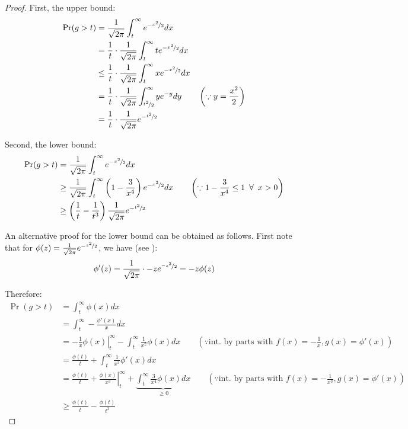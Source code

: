 \documentclass{article}
\theoremstyle{remark}
\begin{document}
\begin{proof}
First, the upper bound:
\begin{align*}
\Pr(g > t) &= \frac{1}{\sqrt{2\pi}}\int_{t}^{\infty} e^{-\nicefrac{x^{2}}{2}} dx \\
&= \frac{1}{t} \cdot \frac{1}{\sqrt{2\pi}}\int_{t}^{\infty} te^{-\nicefrac{x^{2}}{2}} dx \\
&\leq \frac{1}{t} \cdot \frac{1}{\sqrt{2\pi}}\int_{t}^{\infty} xe^{-\nicefrac{x^{2}}{2}} dx \\
&= \frac{1}{t} \cdot \frac{1}{\sqrt{2\pi}}\int_{\nicefrac{t^{2}}{2}}^{\infty} ye^{-y} dy \qquad \left(\because y = \frac{x^{2}}{2}\right)\\
&= \frac{1}{t} \cdot \frac{1}{\sqrt{2\pi}}e^{-\nicefrac{t^{2}}{2}}
\end{align*}

Second, the lower bound:
\begin{align*}
\Pr(g > t) &= \frac{1}{\sqrt{2\pi}}\int_{t}^{\infty} e^{-\nicefrac{x^{2}}{2}} dx \\
&\geq \frac{1}{\sqrt{2\pi}}\int_{t}^{\infty} \left(1 - \frac{3}{x^{4}}\right)e^{-\nicefrac{x^{2}}{2}} dx \qquad \left(\because 1 - \frac{3}{x^{4}} \leq 1 \enskip \forall \enskip x > 0\right) \\
&\geq \left(\frac{1}{t} - \frac{1}{t^{3}}\right)\frac{1}{\sqrt{2\pi}}e^{-\nicefrac{t^{2}}{2}}
\end{align*}

An alternative proof for the lower bound can be obtained as follows. First note that for \(\phi(z) = \frac{1}{\sqrt{2\pi}}e^{-\nicefrac{z^{2}}{2}}\), we have (see \citep{wainwright2019high}):
\begin{equation*}
\phi'(z) = \frac{1}{\sqrt{2\pi}} \cdot -ze^{\nicefrac{-z^{2}}{2}} = -z\phi(z)
\end{equation*}

Therefore:
\begin{align*}
\Pr(g > t) &= \int_{t}^{\infty} \phi(x) dx \\
&= \int_{t}^{\infty} -\frac{\phi'(x)}{x} dx \\
&= \left. -\frac{1}{x}\phi(x)\right|_{t}^{\infty} - \int_{t}^{\infty} \frac{1}{x^{2}}\phi(x) dx \qquad \left(\because \text{int. by parts with } f(x) = -\frac{1}{x}, g(x) = \phi'(x)\right)\\
&= \frac{\phi(t)}{t} + \int_{t}^{\infty} \frac{1}{x^{3}}\phi'(x) dx \\
&= \frac{\phi(t)}{t} + \left.\frac{\phi(x)}{x^{3}}\right|_{t}^{\infty} + \underbrace{\int_{t}^{\infty} \frac{3}{x^{4}}\phi(x) dx}_{\geq 0} \qquad \left(\because \text{int. by parts with } f(x) = -\frac{1}{x^{3}}, g(x) = \phi'(x)\right)\\
&\geq \frac{\phi(t)}{t} - \frac{\phi(t)}{t^{3}}
\end{align*}
\end{proof}
\end{document}
